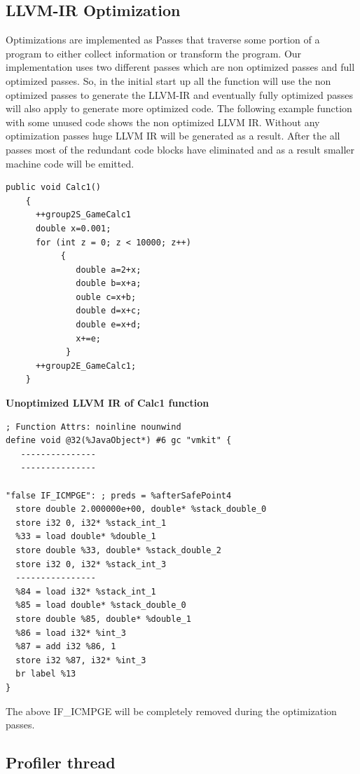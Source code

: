 \subsection{LLVM-IR Optimization}
Optimizations are implemented as Passes that traverse some portion of a program to either collect information or transform the program.  Our implementation uses two different passes which are non optimized passes and full optimized passes. So, in the initial start up all the function will use the non optimized passes to generate the LLVM-IR and eventually fully optimized  passes will also apply to generate more optimized code. The following example function with some unused code shows the non optimized  LLVM IR.  Without any optimization passes huge LLVM IR will be generated as a result.  After the all passes most of the redundant code blocks have  eliminated  and as a result smaller machine code will be emitted.\\

\scriptsize\begin{verbatim}
public void Calc1() 
    { 
      ++group2S_GameCalc1
      double x=0.001; 
      for (int z = 0; z < 10000; z++) 
           {	 
              double a=2+x; 
              double b=x+a; 
              ouble c=x+b; 
              double d=x+c;
              double e=x+d; 
              x+=e; 
            } 
      ++group2E_GameCalc1;
    }

\end{verbatim}

\textbf{Unoptimized LLVM IR of Calc1 function}
\begin{verbatim}
; Function Attrs: noinline nounwind 
define void @32(%JavaObject*) #6 gc "vmkit" { 
   ---------------
   ---------------

"false IF_ICMPGE": ; preds = %afterSafePoint4 
  store double 2.000000e+00, double* %stack_double_0 
  store i32 0, i32* %stack_int_1 
  %33 = load double* %double_1 
  store double %33, double* %stack_double_2 
  store i32 0, i32* %stack_int_3 
  ----------------
  %84 = load i32* %stack_int_1 
  %85 = load double* %stack_double_0 
  store double %85, double* %double_1 
  %86 = load i32* %int_3 
  %87 = add i32 %86, 1 
  store i32 %87, i32* %int_3 
  br label %13 
} 

\end{verbatim}
\normalsize
The above IF\_ICMPGE will be completely removed during the optimization passes. 
\subsection{Profiler thread}

